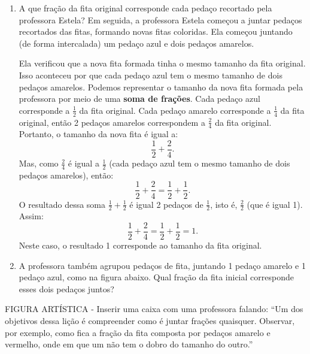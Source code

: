 \documentclass[a4,12pt]{book}
\begin{document}
\begin{enumerate} [\quad a)] %
  \item     A que fração da fita original corresponde cada pedaço recortado pela professora Estela?    \mbox{} \newline           \mbox{} \newline      Em seguida, a professora Estela começou a juntar pedaços recortados das fitas, formando novas fitas coloridas. Ela começou juntando (de forma intercalada) um pedaço azul e dois pedaços amarelos.     \mbox{} \newline      

\begin{center}
\end{center}

Ela verificou que a nova fita formada tinha o mesmo tamanho da fita original. Isso aconteceu por que cada pedaço azul tem o mesmo tamanho de dois pedaços amarelos. Podemos representar o tamanho da nova fita formada pela professora por meio de uma {\bf soma de frações}. Cada pedaço azul corresponde a $\frac{1}{2}$ da fita original. Cada pedaço amarelo corresponde a $\frac{1}{4}$ da fita original, então 2 pedaços amarelos correspondem a $\frac{2}{4}$ da fita original. Portanto, o tamanho da nova fita é igual a: $$\dfrac{1}{2} + \dfrac{2}{4}.$$ Mas, como $\frac{2}{4}$ é igual a $\frac{1}{2}$ (cada pedaço azul tem o mesmo tamanho de dois pedaços amarelos), então: $$\dfrac{1}{2} + \dfrac{2}{4} = \dfrac{1}{2} + \dfrac{1}{2}.$$ O resultado dessa soma $\frac{1}{2} + \frac{1}{2}$ é igual 2 pedaços de $\frac{1}{2}$, isto é, $\frac{2}{2}$ (que é igual 1). Assim: $$\dfrac{1}{2} + \dfrac{2}{4} = \dfrac{1}{2} + \dfrac{1}{2} = 1.$$ Neste caso, o resultado 1 corresponde ao tamanho da fita original.
  \item     A professora também agrupou pedaços de fita, juntando 1 pedaço amarelo e 1 pedaço azul, como na figura abaixo. Qual fração da fita inicial corresponde esses dois pedaços juntos?
\end{enumerate} %

   
\begin{imagem*}[breakable]{}{}   FIGURA ARTÍSTICA - Inserir uma caixa com uma professora falando:   ``Um dos objetivos dessa lição é compreender como é juntar frações quaisquer. Observar, por exemplo, como fica a fração da fita composta por pedaços amarelo e vermelho, onde em que um não tem o dobro do tamanho do outro.''\end{imagem*}
\end{document}
